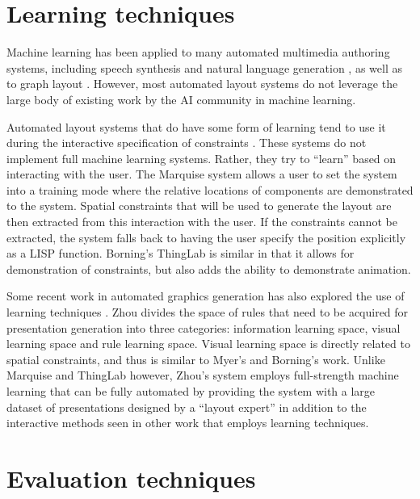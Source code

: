     \section{Learning techniques}
    \label{learning-techniques}

		Machine learning has been applied to many automated multimedia authoring
		systems, including speech synthesis \citep{pan-1} and natural language
		generation \citep{kamimura-1}, as well as to graph layout \citep{masui-1}.
		However, most automated layout systems do not leverage the large body of
		existing work by the AI community in machine learning.

		Automated layout systems that do have some form of learning tend to use it
		during the interactive specification of constraints
		\citep{myers-1,borning-1}. These systems do not implement full machine
		learning systems. Rather, they try to “learn” based on interacting with the
		user. The Marquise system \citep{myers-1} allows a user to set the system
		into a training mode where the relative locations of components are
		demonstrated to the system. Spatial constraints that will be used to
		generate the layout are then extracted from this interaction with the user.
		If the constraints cannot be extracted, the system falls back to having the
		user specify the position explicitly as a LISP function. Borning’s
		\citep{borning-1} ThingLab is similar in that it allows for demonstration
		of constraints, but also adds the ability to demonstrate animation.

    Some recent work in automated graphics generation has also explored the use of learning techniques \citep{zhou-3}. Zhou divides the space of rules that need to be acquired for presentation generation into three categories: information learning space, visual learning space and rule learning space. Visual learning space is directly related to spatial constraints, and thus is similar to Myer’s and Borning’s work. Unlike Marquise and ThingLab however, Zhou’s system employs full-strength machine learning that can be fully automated by providing the system with a large dataset of presentations designed by a “layout expert” in addition to the interactive methods seen in other work that employs learning techniques.

    \section{Evaluation techniques}
    \label{evaluation-techniques}

